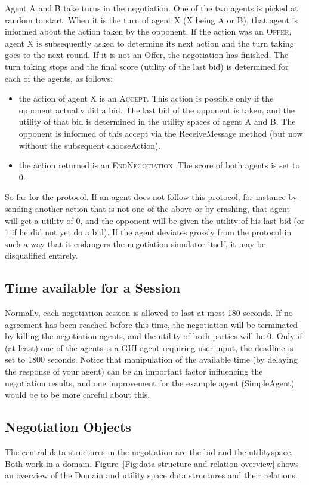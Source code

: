 \documentclass[]{article}
\begin{document}
Agent A and B take turns in the negotiation. One of the two agents is picked at random to start. When it is the turn of agent X (X being A or B), that agent is informed about the action taken by the opponent. If the action was an \textsc{Offer}, agent X is subsequently asked to determine its next action and the turn taking goes to the next round. If it is not an Offer, the negotiation has finished. The turn taking stops and the final score (utility of the last bid) is determined for each of the agents, as follows:
\begin{itemize}
	\item the action of agent X is an \textsc{Accept}. This action is possible only if the opponent actually did a bid. The last bid of the opponent is taken, and the utility of that bid is determined in the utility spaces of agent A and B. The opponent is informed of this accept via the ReceiveMessage method (but now without the subsequent chooseAction).
	\item the action returned is an \textsc{EndNegotiation}. The score of both agents is set to 0.
\end{itemize}

So far for the protocol. If an agent does not follow this protocol, for instance by sending another action that is not one of the above or by crashing, that agent will get a utility of 0, and the opponent will be given the utility of his last bid (or 1 if he did not yet do a bid). If the agent deviates grossly from the protocol in such a way that it endangers the negotiation simulator itself, it may be disqualified entirely.

\subsection{Time available for a Session}

Normally, each negotiation session is allowed to last at most 180 seconds. If no agreement has been reached before this time, the negotiation will be terminated by killing the negotiation agents, and the utility of both parties will be 0. Only if (at least) one of the agents is a GUI agent requiring user input, the deadline is set to 1800 seconds. Notice that manipulation of the available time (by delaying the response of your agent) can be an important factor influencing the negotiation results, and one improvement for the example agent (SimpleAgent) would be to be more careful about this.

\subsection{Negotiation Objects}
The central data structures in the negotiation are the bid and the utilityspace. Both work in a domain. Figure~\ref{Fig:data structure and relation overview} shows an overview of the Domain and utility space data structures and their relations.
\end{document}
